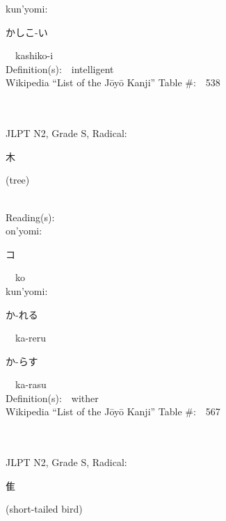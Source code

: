 \begin{multicols}{2}
{\hspace*{1em}}kun'yomi:\ \ \\
{\hspace*{2em}}{\begin{CJK}{UTF8}{min} かしこ-い \end{CJK}}\ \ kashiko-i\ \ \\
Definition(s):\ \ intelligent \\
Wikipedia ``List of the J\=oy\=o Kanji'' Table \#:\ \ 538 \\
\ \ \\
{\fontsize{34pt}{40pt}  }\ \ \\  %
{JLPT N2, Grade S, Radical:\ \ {\begin{CJK}{UTF8}{min} 木 \end{CJK}} (tree) } \\
Reading(s):\ \ \\
{\hspace*{1em}}on'yomi:\ \ \\
{\hspace*{2em}}{\begin{CJK}{UTF8}{min} コ \end{CJK}}\ \ ko\ \ \\
{\hspace*{1em}}kun'yomi:\ \ \\
{\hspace*{2em}}{\begin{CJK}{UTF8}{min} か-れる \end{CJK}}\ \ ka-reru\ \ \\
{\hspace*{2em}}{\begin{CJK}{UTF8}{min} か-らす \end{CJK}}\ \ ka-rasu\ \ \\
Definition(s):\ \ wither \\
Wikipedia ``List of the J\=oy\=o Kanji'' Table \#:\ \ 567 \\
\ \ \\
{\fontsize{34pt}{40pt}  }\ \ \\  %
{JLPT N2, Grade S, Radical:\ \ {\begin{CJK}{UTF8}{min} 隹 \end{CJK}} (short-tailed bird) } \\

\end{multicols}

